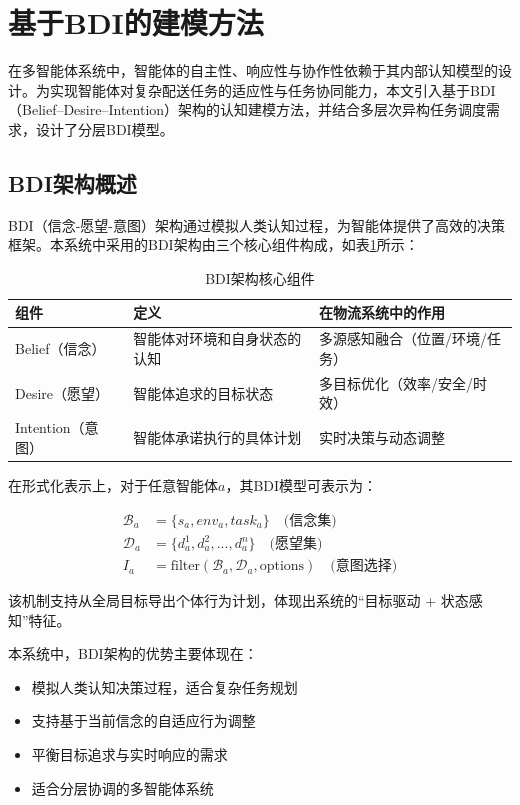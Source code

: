 \documentclass[12pt,a4paper]{article}
\begin{document}
\section{基于BDI的建模方法}

在多智能体系统中，智能体的自主性、响应性与协作性依赖于其内部认知模型的设计。为实现智能体对复杂配送任务的适应性与任务协同能力，本文引入基于BDI（Belief–Desire–Intention）架构的认知建模方法，并结合多层次异构任务调度需求，设计了分层BDI模型。

\subsection{BDI架构概述}

BDI（信念-愿望-意图）架构通过模拟人类认知过程，为智能体提供了高效的决策框架。本系统中采用的BDI架构由三个核心组件构成，如表\ref{tab:bdi-components}所示：

\begin{table}[h]
\centering
\caption{BDI架构核心组件}
\label{tab:bdi-components}
\begin{tabular}{|>{\centering\arraybackslash}p{3cm}|>{\raggedright\arraybackslash}p{5cm}|>{\raggedright\arraybackslash}p{6cm}|}
\hline
\textbf{组件} & \textbf{定义} & \textbf{在物流系统中的作用} \\
\hline
\rowcolor{lightgray}
Belief（信念） & 智能体对环境和自身状态的认知 & 多源感知融合（位置/环境/任务） \\
\hline
Desire（愿望） & 智能体追求的目标状态 & 多目标优化（效率/安全/时效） \\
\hline
\rowcolor{lightgray}
Intention（意图） & 智能体承诺执行的具体计划 & 实时决策与动态调整 \\
\hline
\end{tabular}
\end{table}

在形式化表示上，对于任意智能体$a$，其BDI模型可表示为：

\begin{align}
\mathcal{B}_a &= \{s_a, env_a, task_a\} \quad \text{(信念集)} \\
\mathcal{D}_a &= \{d^1_a, d^2_a, ..., d^n_a\} \quad \text{(愿望集)} \\
I_a &= \text{filter}(\mathcal{B}_a, \mathcal{D}_a, \text{options}) \quad \text{(意图选择)}
\end{align}

该机制支持从全局目标导出个体行为计划，体现出系统的“目标驱动 + 状态感知”特征。

本系统中，BDI架构的优势主要体现在：
\begin{itemize}
    \item 模拟人类认知决策过程，适合复杂任务规划
    \item 支持基于当前信念的自适应行为调整
    \item 平衡目标追求与实时响应的需求
    \item 适合分层协调的多智能体系统
\end{itemize}
\end{document}
